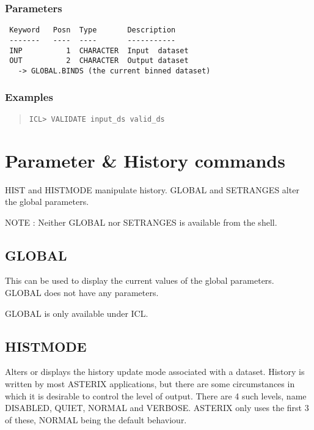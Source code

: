 \documentclass{book}
\renewcommand{\_}{{\tt\char'137}}     %
\begin{document}
\subsection{Parameters}
\begin{verbatim}
 Keyword   Posn  Type       Description
 -------   ----  ----       -----------
 INP          1  CHARACTER  Input  dataset
 OUT          2  CHARACTER  Output dataset
   -> GLOBAL.BINDS (the current binned dataset)

\end{verbatim}\subsection{Examples}
\begin{quote}\begin{verbatim}
ICL> VALIDATE input_ds valid_ds
\end{verbatim}\end{quote}
\chapter{Parameter \& History commands}
HIST and HISTMODE manipulate history. GLOBAL and SETRANGES
alter the global parameters.

NOTE : Neither GLOBAL nor SETRANGES is available from the shell.

\section{GLOBAL}
This can be used to display the current values of the global
parameters. GLOBAL does not have any parameters.

GLOBAL is only available under ICL.

\section{HISTMODE}
Alters or displays the history update mode associated with
a dataset. History is written by most ASTERIX applications,
but there are some circumstances in which it is desirable
to control the level of output. There are 4 such levels,
name DISABLED, QUIET, NORMAL and VERBOSE. ASTERIX only uses
the first 3 of these, NORMAL being the default behaviour.
\end{document}
